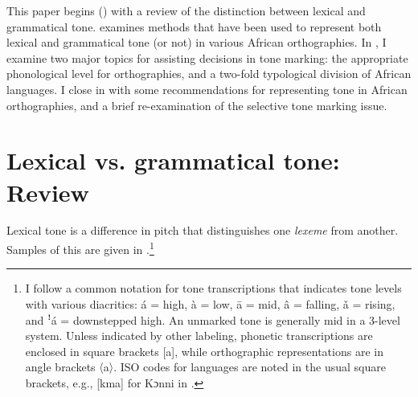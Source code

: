 \documentclass[output=paper]{langscibook}
\begin{document}
This paper begins () with a review of the distinction between lexical and grammatical tone.  examines methods that have been used to represent both lexical and grammatical tone (or not) in various African orthographies. In , I examine two major topics for assisting decisions in tone marking: the appropriate phonological level for orthographies, and a two-fold typological division of African languages. I close in  with some recommendations for representing tone in African orthographies, and a brief re-examination of the selective tone marking issue.

\section{Lexical vs. grammatical tone: Review}
\label{sec:LexicalVgrammaticalTone:2}
Lexical tone is a difference in pitch that distinguishes one \textit{lexeme} from another. Samples of this are given in .\footnote{I follow a common notation for tone transcriptions that indicates tone levels with various diacritics: á = high, à = low, ā = mid, â = falling, ǎ = rising, and ꜝá = downstepped high. An unmarked tone is generally mid in a 3-level system. Unless indicated by other labeling, phonetic transcriptions are enclosed in square brackets [a], while orthographic representations are in angle brackets 〈a〉. ISO codes for languages are noted in the usual square brackets, e.g., [kma] for Kɔnni in .}
\end{document}
